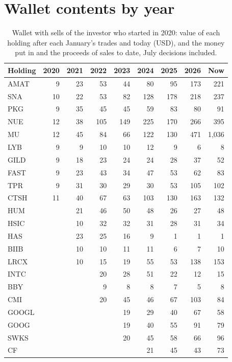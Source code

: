 \documentclass[11pt,a4paper]{article}
\begin{document}
\section{Wallet contents by year}
\label{app:contents}
\begin{table}[H]
\centering
\small
\caption{Wallet with sells of the investor who started in 2020: value of each holding after each January's trades and today (USD), and the money put in and the proceeds of sales to date, July decisions included.}\label{tab:contents}
\begin{tabular}{l r r r r r r r r }
\hline
Holding & 2020 & 2021 & 2022 & 2023 & 2024 & 2025 & 2026 & Now \\
\hline
AMAT & 9 & 23 & 53 & 44 & 80 & 95 & 173 & 221 \\
SNA & 10 & 22 & 53 & 82 & 128 & 178 & 218 & 237 \\
PKG & 9 & 35 & 45 & 45 & 59 & 83 & 80 & 91 \\
NUE & 12 & 38 & 105 & 149 & 225 & 170 & 266 & 395 \\
MU & 12 & 45 & 84 & 66 & 122 & 130 & 471 & 1,036 \\
LYB & 9 & 9 & 10 & 10 & 12 & 9 & 6 & 8 \\
GILD & 9 & 18 & 23 & 24 & 24 & 28 & 37 & 52 \\
FAST & 9 & 23 & 43 & 34 & 47 & 53 & 62 & 83 \\
TPR & 9 & 31 & 30 & 29 & 30 & 53 & 105 & 102 \\
CTSH & 11 & 40 & 67 & 63 & 103 & 130 & 163 & 132 \\
HUM &  & 21 & 46 & 50 & 48 & 26 & 27 & 48 \\
HSIC &  & 10 & 32 & 32 & 31 & 28 & 31 & 34 \\
HAS &  & 23 & 25 & 16 & 9 & 1 & 1 & 1 \\
BIIB &  & 10 & 10 & 11 & 11 & 6 & 7 & 10 \\
LRCX &  & 10 & 15 & 19 & 55 & 53 & 138 & 153 \\
INTC &  &  & 20 & 28 & 51 & 22 & 12 & 15 \\
BBY &  &  & 9 & 8 & 8 & 7 & 5 & 8 \\
CMI &  &  & 20 & 45 & 46 & 67 & 103 & 84 \\
GOOGL &  &  &  & 19 & 29 & 40 & 67 & 58 \\
GOOG &  &  &  & 19 & 40 & 55 & 91 & 79 \\
SWKS &  &  &  & 20 & 45 & 58 & 66 & 96 \\
CF &  &  &  &  & 21 & 45 & 43 & 73 \\

\end{tabular}
\end{table}
\end{document}
